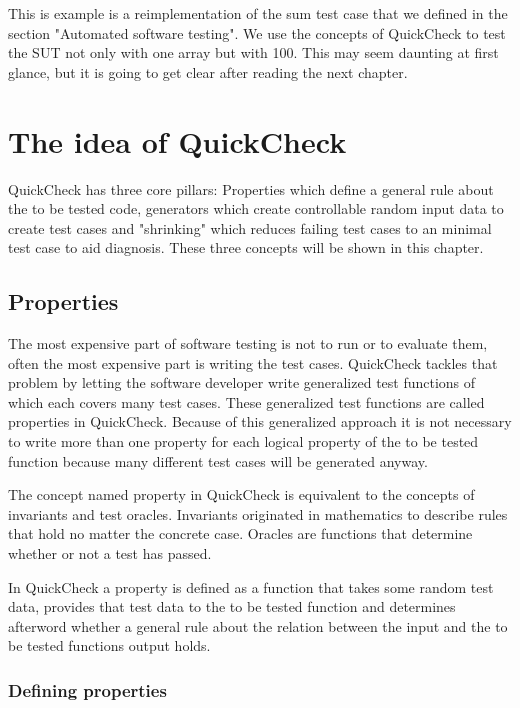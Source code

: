 \documentclass[a4paper, 12pt]{article} %
\begin{document}
This is example is a reimplementation of the sum test case that we defined in the section "Automated software testing". We use the concepts of QuickCheck to test the SUT not only with one array but with 100. This may seem daunting at first glance, but it is going to get clear after reading the next chapter.

\newpage
\section{The idea of QuickCheck}

QuickCheck has three core pillars: Properties which define a general rule about the to be tested code, generators which create controllable random input data to create test cases and "shrinking" which reduces failing test cases to an minimal test case to aid diagnosis. These three concepts will be shown in this chapter.

\subsection{Properties}

The most expensive part of software testing is not to run or to evaluate them, often the most expensive part is writing the test cases. QuickCheck tackles that problem by letting the software developer write generalized test functions of which each covers many test cases. These generalized test functions are called properties in QuickCheck\cite{Hughes2010}. Because of this generalized approach it is not necessary to write more than one property for each logical property of the to be tested function because many different test cases will be generated anyway\cite{Hughes2006}.

The concept named property in QuickCheck is equivalent to the concepts of invariants and test oracles. Invariants originated in mathematics to describe rules that hold no matter the concrete case. Oracles are functions that determine whether or not a test has passed.

In QuickCheck a property is defined as a function that takes some random test data, provides that test data to the to be tested function and determines afterword whether a general rule about the relation between the input and the to be tested functions output holds.

\subsubsection{Defining properties}
\end{document}
